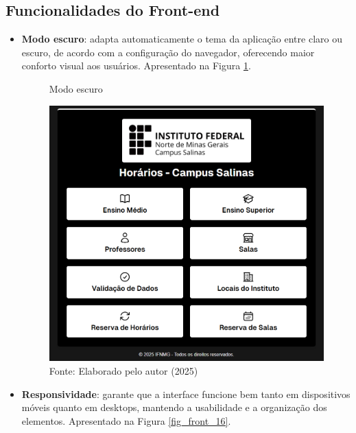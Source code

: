 \subsection{Funcionalidades do Front-end}

\begin{itemize}
    \item \textbf{Modo escuro}: adapta automaticamente o tema da aplicação entre claro ou escuro, de acordo com a configuração do navegador, oferecendo maior conforto visual aos usuários. Apresentado na Figura \ref{fig_front_15}.

    \begin{figure}[htb]
        \centering
        \caption{Modo escuro}
        \includegraphics[width=1\textwidth]{Figuras/front-15.png}
        \caption*{Fonte: Elaborado pelo autor (2025)}
        \label{fig_front_15}
    \end{figure}

    \item \textbf{Responsividade}: garante que a interface funcione bem tanto em dispositivos móveis quanto em desktops, mantendo a usabilidade e a organização dos elementos. Apresentado na Figura \ref{fig_front_16}.


\end{itemize}
